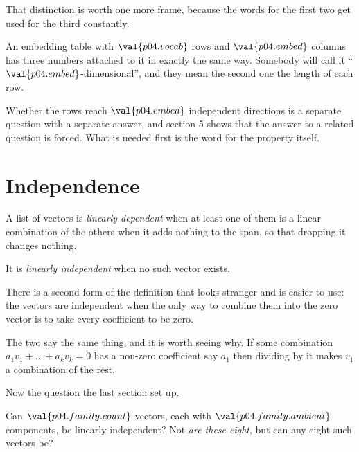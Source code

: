 \begin{fr}

That distinction is worth one more frame, because the words for the first two
get used for the third constantly.

An embedding table with $\val{p04.vocab}$ rows and $\val{p04.embed}$ columns
has three numbers attached to it in exactly the same way. Somebody will call it
\enquote{$\val{p04.embed}$-dimensional}, and they mean the second one \dash{}
the length of each row.

Whether the rows reach $\val{p04.embed}$ independent directions is a separate
question with a separate answer, and section 5 shows that the answer to a
related question is forced. What is needed first is the word for the property
itself.
\end{fr}

\section{Independence}
\label{sec:P04-independence}

\begin{fr}
A list of vectors is \emph{linearly dependent} when at least one of them is a
linear combination of the others \dash{} when it adds nothing to the span, so
that dropping it changes nothing.

It is \emph{linearly independent} when no such vector exists.

There is a second form of the definition that looks stranger and is easier to
use: the vectors are independent when the only way to combine them into the
zero vector is to take every coefficient to be zero.

The two say the same thing, and it is worth seeing why. If some combination
$a_1 v_1 + \dots + a_k v_k = 0$ has a non-zero coefficient \dash{} say $a_1$
\dash{} then dividing by it makes $v_1$ a combination of the rest.
\end{fr}

\begin{fr}
Now the question the last section set up.

Can $\val{p04.family.count}$ vectors, each with $\val{p04.family.ambient}$
components, be linearly independent? Not \emph{are these eight}, but can any
eight such vectors be?
\nextframe
\end{fr}


